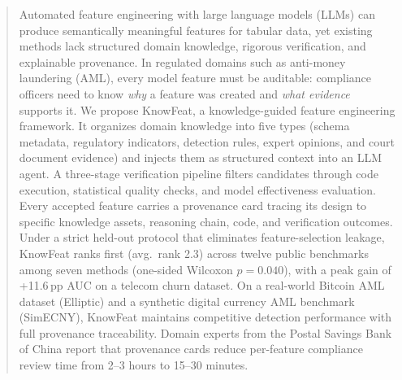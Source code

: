 \begin{abstract}
Automated feature engineering with large language models (LLMs) can produce semantically meaningful features for tabular data, yet existing methods lack structured domain knowledge, rigorous verification, and explainable provenance. In regulated domains such as anti-money laundering (AML), every model feature must be auditable: compliance officers need to know \emph{why} a feature was created and \emph{what evidence} supports it. We propose KnowFeat, a knowledge-guided feature engineering framework. It organizes domain knowledge into five types (schema metadata, regulatory indicators, detection rules, expert opinions, and court document evidence) and injects them as structured context into an LLM agent. A three-stage verification pipeline filters candidates through code execution, statistical quality checks, and model effectiveness evaluation. Every accepted feature carries a provenance card tracing its design to specific knowledge assets, reasoning chain, code, and verification outcomes. Under a strict held-out protocol that eliminates feature-selection leakage, KnowFeat ranks first (avg.\ rank 2.3) across twelve public benchmarks among seven methods (one-sided Wilcoxon $p{=}0.040$), with a peak gain of +11.6\,pp AUC on a telecom churn dataset. On a real-world Bitcoin AML dataset (Elliptic) and a synthetic digital currency AML benchmark (SimECNY), KnowFeat maintains competitive detection performance with full provenance traceability. Domain experts from the Postal Savings Bank of China report that provenance cards reduce per-feature compliance review time from 2--3 hours to 15--30 minutes.
\end{abstract}
